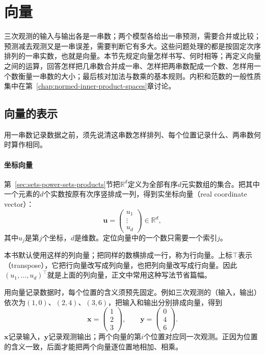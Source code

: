 
\section{向量}
\label{sec:ls-vectors}
\label{sec:ls-objects}
\label{sec:linear-algebra-objects}
\label{sec:linear-algebra-space-representations}
\label{sec:prelim-vectors-matrices}

三次观测的输入与输出各是一串数；两个模型各给出一串预测，需要合并或比较；预测减去观测又是一串误差，需要判断它有多大。这些问题处理的都是按固定次序排列的一串实数，也就是向量。本节先规定向量怎样书写、何时相等；再定义向量之间的运算，回答怎样把几串数合并成一串、怎样把两串数配成一个数、怎样用一个数衡量一串数的大小；最后核对加法与数乘的基本规则。内积和范数的一般性质集中在第~\ref{chap:normed-inner-product-spaces}章讨论。

\subsection{向量的表示}
\label{sec:ls-vector-representation}
\label{sec:prelim-vector-records}

用一串数记录数据之前，须先说清这串数怎样排列、每个位置记录什么、两串数何时算作相同。

\paragraph{坐标向量}
第~\ref{sec:sets-power-sets-products}节把$\mathbb R^d$定义为全部有序$d$元实数组的集合。把其中一个元素的$d$个实数按原有次序竖排成一列，得到实坐标向量（real coordinate vector）：
\[
 \bm u=\begin{pmatrix}u_1\\\vdots\\u_d\end{pmatrix}\in\mathbb R^d,
\]
其中$u_j$是第$j$个坐标，$d$是维数。定位向量中的一个数只需要一个索引$j$。

本书默认使用这样的列向量；把同样的数横排成一行，称为行向量。上标$\top$表示（transpose），它把行向量改写成列向量，也把列向量改写成行向量。因此$(u_1,\ldots,u_d)^\top$就是上面的列向量，正文中常用这种写法节省篇幅。

用向量记录数据时，每个位置的含义须预先固定。例如三次观测的（输入，输出）依次为$(1,0)$、$(2,4)$、$(3,6)$，把输入和输出分别排成向量，得到
\[
 \bm x=\begin{pmatrix}1\\2\\3\end{pmatrix},\qquad
 \bm y=\begin{pmatrix}0\\4\\6\end{pmatrix}.
\]
$\bm x$记录输入，$\bm y$记录观测输出；两个向量的第$i$个位置对应同一次观测。正因为位置的含义一致，后面才能把两个向量逐位置地相加、相乘。

